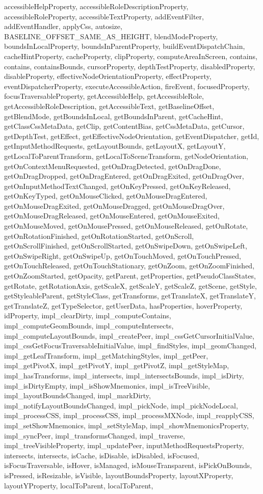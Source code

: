 {{{{{{{{{{{{{{{{{{{{{{{{{{{{{{{{{{{{accessibleHelpProperty, accessibleRoleDescriptionProperty, accessibleRoleProperty, accessibleTextProperty, addEventFilter, addEventHandler, applyCss, autosize, BASELINE\_OFFSET\_SAME\_AS\_HEIGHT, blendModeProperty, boundsInLocalProperty, boundsInParentProperty, buildEventDispatchChain, cacheHintProperty, cacheProperty, clipProperty, computeAreaInScreen, contains, contains, containsBounds, cursorProperty, depthTestProperty, disabledProperty, disableProperty, effectiveNodeOrientationProperty, effectProperty, eventDispatcherProperty, executeAccessibleAction, fireEvent, focusedProperty, focusTraversableProperty, getAccessibleHelp, getAccessibleRole, getAccessibleRoleDescription, getAccessibleText, getBaselineOffset, getBlendMode, getBoundsInLocal, getBoundsInParent, getCacheHint, getClassCssMetaData, getClip, getContentBias, getCssMetaData, getCursor, getDepthTest, getEffect, getEffectiveNodeOrientation, getEventDispatcher, getId, getInputMethodRequests, getLayoutBounds, getLayoutX, getLayoutY, getLocalToParentTransform, getLocalToSceneTransform, getNodeOrientation, getOnContextMenuRequested, getOnDragDetected, getOnDragDone, getOnDragDropped, getOnDragEntered, getOnDragExited, getOnDragOver, getOnInputMethodTextChanged, getOnKeyPressed, getOnKeyReleased, getOnKeyTyped, getOnMouseClicked, getOnMouseDragEntered, getOnMouseDragExited, getOnMouseDragged, getOnMouseDragOver, getOnMouseDragReleased, getOnMouseEntered, getOnMouseExited, getOnMouseMoved, getOnMousePressed, getOnMouseReleased, getOnRotate, getOnRotationFinished, getOnRotationStarted, getOnScroll, getOnScrollFinished, getOnScrollStarted, getOnSwipeDown, getOnSwipeLeft, getOnSwipeRight, getOnSwipeUp, getOnTouchMoved, getOnTouchPressed, getOnTouchReleased, getOnTouchStationary, getOnZoom, getOnZoomFinished, getOnZoomStarted, getOpacity, getParent, getProperties, getPseudoClassStates, getRotate, getRotationAxis, getScaleX, getScaleY, getScaleZ, getScene, getStyle, getStyleableParent, getStyleClass, getTransforms, getTranslateX, getTranslateY, getTranslateZ, getTypeSelector, getUserData, hasProperties, hoverProperty, idProperty, impl\_clearDirty, impl\_computeContains, impl\_computeGeomBounds, impl\_computeIntersects, impl\_computeLayoutBounds, impl\_createPeer, impl\_cssGetCursorInitialValue, impl\_cssGetFocusTraversableInitialValue, impl\_findStyles, impl\_geomChanged, impl\_getLeafTransform, impl\_getMatchingStyles, impl\_getPeer, impl\_getPivotX, impl\_getPivotY, impl\_getPivotZ, impl\_getStyleMap, impl\_hasTransforms, impl\_intersects, impl\_intersectsBounds, impl\_isDirty, impl\_isDirtyEmpty, impl\_isShowMnemonics, impl\_isTreeVisible, impl\_layoutBoundsChanged, impl\_markDirty, impl\_notifyLayoutBoundsChanged, impl\_pickNode, impl\_pickNodeLocal, impl\_processCSS, impl\_processCSS, impl\_processMXNode, impl\_reapplyCSS, impl\_setShowMnemonics, impl\_setStyleMap, impl\_showMnemonicsProperty, impl\_syncPeer, impl\_transformsChanged, impl\_traverse, impl\_treeVisibleProperty, impl\_updatePeer, inputMethodRequestsProperty, intersects, intersects, isCache, isDisable, isDisabled, isFocused, isFocusTraversable, isHover, isManaged, isMouseTransparent, isPickOnBounds, isPressed, isResizable, isVisible, layoutBoundsProperty, layoutXProperty, layoutYProperty, localToParent, localToParent, }}}}}}}}}}}}}}}}}}}}}}}}}}}}}}}}}}}}
